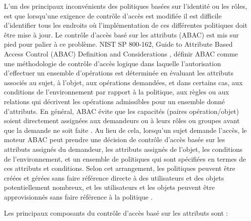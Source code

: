 \label{sectionABAC}

L'un des principaux inconvénients des politiques basées sur l'identité ou les rôles, est que lorsqu'une exigence de contrôle d'accès est modifiée il est difficile d'identifier tous les endroits où l'implémentation de ces différentes politiques doit être mise à jour. Le contrôle d'accès basé sur les attributs (ABAC) est mis sur pied pour palier à ce problème. NIST SP 800-162, Guide to Attribute Based Access Control (ABAC) Definition and Considerations \cite{hu20}, définir ABAC comme une méthodologie de contrôle d'accès logique dans laquelle l'autorisation d'effectuer un ensemble d'opérations est déterminée en évaluant les attributs associés au sujet, à l'objet, aux opérations demandées, et dans certains cas, aux conditions de l'environnement par rapport à la politique, aux règles ou aux relations qui décrivent les opérations admissibles pour un ensemble donné d'attributs. En général, ABAC évite que les capacités (paires opération/objet) soient directement assignées aux demandeurs ou à leurs rôles ou groupes avant que la demande ne soit faite \cite{hu20}. Au lieu de cela, lorsqu'un sujet demande l'accès, le moteur ABAC peut prendre une décision de contrôle d'accès basée sur les attributs assignés du demandeur, les attributs assignés de l'objet, les conditions de l'environnement, et un ensemble de politiques qui sont spécifiées en termes de ces attributs et conditions. Selon cet arrangement, les politiques peuvent être créées et gérées sans faire référence directe à des utilisateurs et des objets potentiellement nombreux, et les utilisateurs et les objets peuvent être approvisionnés sans faire référence à la politique \cite{Vin15}. 

\label{sectionComposantAbac}

Les principaux composants du contrôle d'accès basé sur les attributs sont \cite{hu20} :

